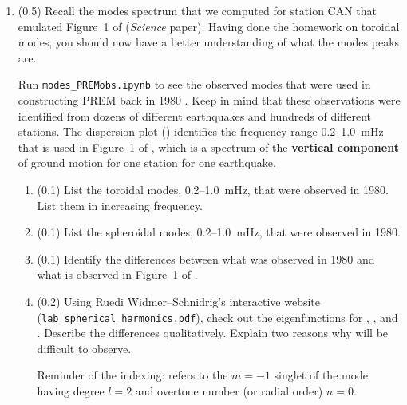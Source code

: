 \documentclass[11pt,titlepage,fleqn]{article}
\newcommand{\tfilelab}{{\tt lab\_sumatraB.ipynb}}
\begin{document}
\begin{enumerate}
\item (0.5) Recall the modes spectrum that we computed for station CAN that emulated Figure~1 of \citet{Park2005} ({\em Science} paper). Having done the homework on toroidal modes, you should now have a better understanding of what the modes peaks are.

Run \verb+modes_PREMobs.ipynb+ to see the observed modes that were used in constructing PREM back in 1980 \citep{PREM}. Keep in mind that these observations were identified from dozens of different earthquakes and hundreds of different stations.
The dispersion plot () identifies the frequency range 0.2--1.0~mHz that is used in Figure~1 of \citet{Park2005}, which is a spectrum of the {\bf vertical component} of ground motion for one station for one earthquake.
%
\begin{enumerate}
\item (0.1) List the toroidal modes, 0.2--1.0~mHz, that were observed in 1980. \\
List them in increasing frequency.
\item (0.1) List the spheroidal modes, 0.2--1.0~mHz, that were observed in 1980.
\item (0.1) Identify the differences between what was observed in 1980 and what is observed in Figure~1 of \citet{Park2005}.
\item (0.2) Using Ruedi Widmer--Schnidrig's interactive website (\verb+lab_spherical_harmonics.pdf+), check out the eigenfunctions for , , and . Describe the differences qualitatively. Explain two reasons why  will be difficult to observe.

Reminder of the indexing:  refers to the $m=-1$ singlet of the mode having degree $l=2$ and overtone number (or radial order) $n=0$.
\end{enumerate}




\end{enumerate}
\end{document}
